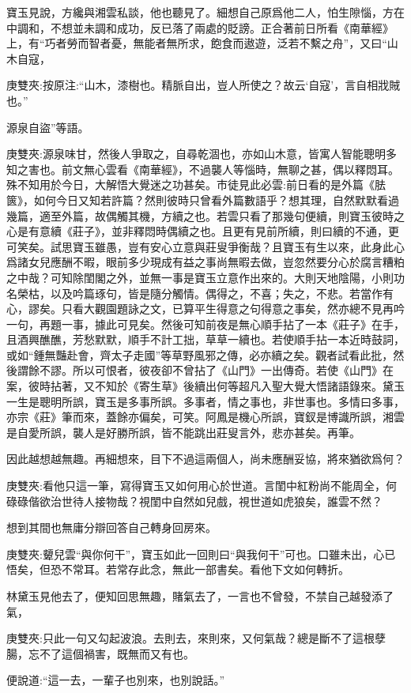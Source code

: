 \begin{parag}
    寶玉見說，方纔與湘雲私談，他也聽見了。細想自己原爲他二人，怕生隙惱，方在中調和，不想並未調和成功，反已落了兩處的貶謗。正合著前日所看《南華經》上，有“巧者勞而智者憂，無能者無所求，飽食而遨遊，泛若不繫之舟”，又曰“山木自寇，\begin{note}庚雙夾:按原注:“山木，漆樹也。精脈自出，豈人所使之？故云‘自寇’，言自相戕賊也。”\end{note}源泉自盜”等語。\begin{note}庚雙夾:源泉味甘，然後人爭取之，自尋乾涸也，亦如山木意，皆寓人智能聰明多知之害也。前文無心雲看《南華經》，不過襲人等惱時，無聊之甚，偶以釋悶耳。殊不知用於今日，大解悟大覺迷之功甚矣。市徒見此必雲:前日看的是外篇《胠篋》，如何今日又知若許篇？然則彼時只曾看外篇數語乎？想其理，自然默默看過幾篇，適至外篇，故偶觸其機，方續之也。若雲只看了那幾句便續，則寶玉彼時之心是有意續《莊子》，並非釋悶時偶續之也。且更有見前所續，則曰續的不通，更可笑矣。試思寶玉雖愚，豈有安心立意與莊叟爭衡哉？且寶玉有生以來，此身此心爲諸女兒應酬不暇，眼前多少現成有益之事尚無暇去做，豈忽然要分心於腐言糟粕之中哉？可知除閨閣之外，並無一事是寶玉立意作出來的。大則天地陰陽，小則功名榮枯，以及吟篇琢句，皆是隨分觸情。偶得之，不喜；失之，不悲。若當作有心，謬矣。只看大觀園題詠之文，已算平生得意之句得意之事矣，然亦總不見再吟一句，再題一事，據此可見矣。然後可知前夜是無心順手拈了一本《莊子》在手，且酒興醮醮，芳愁默默，順手不計工拙，草草一續也。若使順手拈一本近時鼓詞，或如“鍾無豔赴會，齊太子走國”等草野風邪之傳，必亦續之矣。觀者試看此批，然後謂餘不謬。所以可恨者，彼夜卻不曾拈了《山門》一出傳奇。若使《山門》在案，彼時拈著，又不知於《寄生草》後續出何等超凡入聖大覺大悟諸語錄來。黛玉一生是聰明所誤，寶玉是多事所誤。多事者，情之事也，非世事也。多情曰多事，亦宗《莊》筆而來，蓋餘亦偏矣，可笑。阿鳳是機心所誤，寶釵是博識所誤，湘雲是自愛所誤，襲人是好勝所誤，皆不能跳出莊叟言外，悲亦甚矣。再筆。\end{note}因此越想越無趣。再細想來，目下不過這兩個人，尚未應酬妥協，將來猶欲爲何？\begin{note}庚雙夾:看他只這一筆，寫得寶玉又如何用心於世道。言閨中紅粉尚不能周全，何碌碌偕欲治世待人接物哉？視閨中自然如兒戲，視世道如虎狼矣，誰雲不然？\end{note}想到其間也無庸分辯回答自己轉身回房來。\begin{note}庚雙夾:顰兒雲“與你何干”，寶玉如此一回則曰“與我何干”可也。口雖未出，心已悟矣，但恐不常耳。若常存此念，無此一部書矣。看他下文如何轉折。\end{note}林黛玉見他去了，便知回思無趣，賭氣去了，一言也不曾發，不禁自己越發添了氣，\begin{note}庚雙夾:只此一句又勾起波浪。去則去，來則來，又何氣哉？總是斷不了這根孽腸，忘不了這個禍害，既無而又有也。\end{note}便說道:“這一去，一輩子也別來，也別說話。”
\end{parag}


